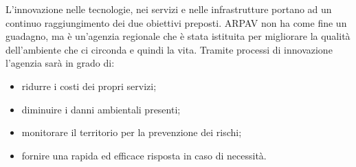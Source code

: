 L'innovazione nelle tecnologie, nei servizi e nelle infrastrutture portano ad un continuo raggiungimento dei due obiettivi preposti. ARPAV non ha come fine un guadagno, ma è un'agenzia regionale che è stata istituita per migliorare la qualità dell'ambiente che ci circonda e quindi la vita. Tramite processi di innovazione l'agenzia sarà in grado di: 
\begin{itemize}
	\item ridurre i costi dei propri servizi;
	\item diminuire i danni ambientali presenti;
	\item monitorare il territorio per la prevenzione dei rischi;
	\item fornire una rapida ed efficace risposta in caso di necessità.
	
\end{itemize}

